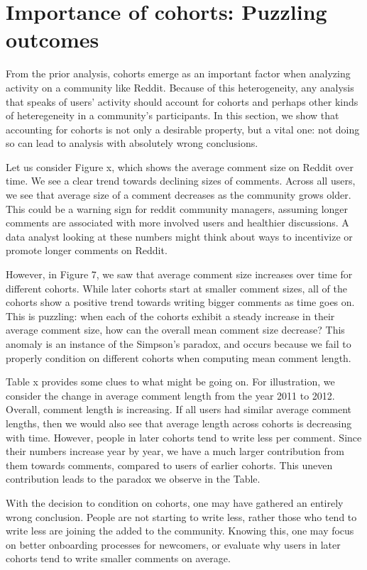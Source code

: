 \section{Importance of cohorts: Puzzling outcomes}
From the prior analysis, cohorts emerge as an important factor when analyzing activity on a community like Reddit. Because of this heterogeneity, any analysis that speaks of users' activity should account for cohorts and perhaps other kinds of heteregeneity in a community's participants. In this section, we show that accounting for cohorts is not only a desirable property, but a vital one: not doing so can lead to analysis with absolutely wrong conclusions. 

Let us consider Figure x, which shows the average comment size on Reddit over time. We see a clear trend towards declining sizes of comments. Across all users, we see that average size of a comment decreases as the community grows older. This could be a warning sign for reddit community managers, assuming longer comments are associated with more involved users and healthier discussions. A data analyst looking at these numbers might think about ways to incentivize or promote longer comments on Reddit. 

However, in Figure 7, we saw that average comment size increases over time for different cohorts. While later cohorts start at smaller comment sizes, all of the cohorts show a positive trend towards writing bigger comments as time goes on. This is puzzling: when each of the cohorts exhibit a steady increase in their average comment size, how can the overall mean comment size decrease? This anomaly is an instance of the Simpson's paradox, and occurs because we fail to properly condition on different cohorts when computing mean comment length. 

Table x provides some clues to what might be going on. For illustration, we consider the change in average comment length from the year 2011 to 2012. Overall, comment length is increasing. If all users had similar average comment lengths, then we would also see that average length across cohorts is decreasing with time. However, people in later cohorts tend to write less per comment. Since their numbers increase year by year, we have a  much larger contribution from them towards comments, compared to users of earlier cohorts. This uneven contribution leads to the paradox we observe in the Table. 

With the decision to condition on cohorts, one may have gathered an entirely wrong conclusion. People  are not starting to write less, rather those who tend to write less are joining the  added to the community. Knowing this, one may focus on better onboarding processes for newcomers, or evaluate why users in later cohorts tend to write smaller comments on average. 